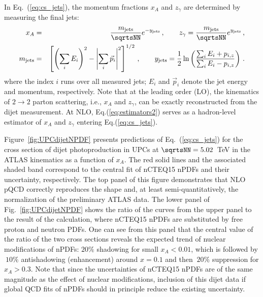\documentclass[../report.tex]{subfiles}
\begin{document}
In Eq.~(\ref{eq:cs_jets}), the momentum fractions $x_A$ and $z_{\gamma}$ are determined by measuring the final jets:
\begin{eqnarray}
x_{A} & =& \frac{m_{\rm jets}}{\sqrtsNN}e^{-y_{\rm jets}} \,, \quad \quad z_{\gamma}=\frac{m_{\rm jets}}{\sqrtsNN}e^{y_{\rm jets}} \,, \nonumber\\
m_{\rm jets} &=& \left[\left(\sum_i E_i\right)^2-\left|\sum_i \vec{p}_i \right|^2 \right]^{1/2} \,, \quad \quad
y_{\rm jets}=\frac{1}{2} \ln \left(\frac{\sum_i E_i+p_{i,z}}{\sum_i E_i-p_{i,z}} \right) \,.
\label{eq:estimators2}
 \end{eqnarray}
 where  the index $i$ runs over all measured jets; $E_i$ and $\vec{p}_i$ denote the jet energy and momentum, respectively.
 Note that at the leading order (LO), the kinematics of $2 \to 2$ parton scattering, i.e., $x_A$ and $z_{\gamma}$, 
 can be exactly reconstructed from the dijet measurement.
 At NLO, Eq.(\ref{eq:estimators2}) serves as a hadron-level estimator of $x_A$ and $z_{\gamma}$
 entering Eq.(\ref{eq:cs_jets}).
 
 Figure~\ref{fig:UPCdijetNPDF}
 presents predictions of Eq.~(\ref{eq:cs_jets}) for the cross section of dijet photoproduction in \PbPb UPCs at $\sqrtsNN=5.02$~TeV in the ATLAS kinematics as a function of $x_A$. The red solid lines and the associated shaded band correspond to the central fit of nCTEQ15 nPDFs and their uncertainty, respectively.
The top panel of this figure demonstrates that NLO pQCD correctly reproduces the shape and, at least 
semi-quantitatively, the normalization of the preliminary ATLAS data.  The lower panel of Fig.~\ref{fig:UPCdijetNPDF} %
shows 
the ratio of the curves from the upper panel to the result of the calculation, where nCTEQ15 nPDFs are substituted by 
free proton and neutron PDFs. One can see from this panel that the central value of the ratio of the two cross sections reveals the expected trend of 
nuclear modifications of nPDFs: $20\%$ shadowing for small $x_A < 0.01$, which is followed by $~10\%$ antishadowing (enhancement)
around $x=0.1$ and then $~20\%$ suppression for $x_A > 0.3$.
Note that since the uncertainties of nCTEQ15 nPDFs are of the same magnitude as the effect of nuclear modifications, 
inclusion of this dijet data if global QCD fits of nPDFs should in principle reduce the existing uncertainty.
\end{document}

